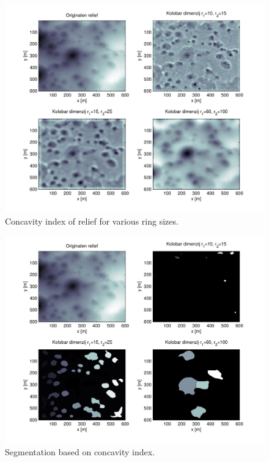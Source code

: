\documentclass[a0,portrait]{a0poster}
\begin{document}
\begin{multicols}{2}
	\begin{minipage}[b]{0.5\textwidth}
      \begin{minipage}{0.45\linewidth}
          \begin{figure}[H]
              \includegraphics[width=\textwidth]{concavity-samples.pdf}
              \caption{Concavity index of relief for various ring sizes.}
              \label{fig:concavity-samples}
          \end{figure}
      \end{minipage}
      \begin{minipage}{0.45\linewidth}
          \begin{figure}[H]
              \includegraphics[width=\textwidth]{concavity-segmentation-samples.pdf}
              \caption{Segmentation based on concavity index.}
              \label{fig:concavity-segmentation}
          \end{figure}
      \end{minipage}
	\end{minipage}


\end{multicols}
\end{document}
